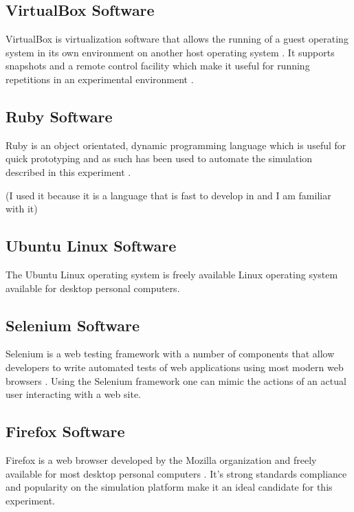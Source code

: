 \subsection{VirtualBox Software}

VirtualBox is virtualization software that allows the running of a guest
operating system in its own environment on another host operating system
\parencite{:fk}.  It supports snapshots and a remote control facility which
make it useful for running repetitions in an experimental environment
\parencite{:uq}.

\subsection{Ruby Software}

Ruby is an object orientated, dynamic programming language which is useful for
quick prototyping and as such has been used to automate the simulation
described in this experiment \parencite{:2010uq}.

(I used it because it is a language that is fast to develop in and I am
familiar with it)

\subsection{Ubuntu Linux Software}

The Ubuntu Linux operating system is freely available Linux operating system
available for desktop personal computers.

\cite{:2010ly}

\subsection{Selenium Software}

Selenium is a web testing framework with a number of components that allow
developers to write automated tests of web applications using most modern web
browsers \parencite{:2010ys}. Using the Selenium framework one can mimic the
actions of an actual user interacting with a web site.

\subsection{Firefox Software}

Firefox is a web browser developed by the Mozilla organization and freely
available for most desktop personal computers \parencite{mozilla}. It's strong
standards compliance \parencite{Hammond:2010fk} and popularity
\parencite{:2010kx,:2010vn} on the simulation platform make it an ideal
candidate for this experiment.

